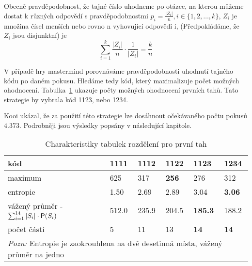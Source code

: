 Obecně pravděpodobnost, že tajné číslo uhodneme po otázce, na kterou můžeme dostat k různých odpovědí s pravděpodobnostmi $p_i = \frac{|Z_i|}{n}, i \in \{1, 2, \dots, k\}$, $Z_i$ je množina čísel menších nebo rovno n vyhovující odpovědi i, (Předpokládáme, že $Z_i$ jsou disjunktní) je 
\[\sum_{i = 1}^k \frac{|Z_i|}{n} \cdot \frac{1}{|Z_i|} = \frac{k}{n}\]

V případě hry mastermind porovnáváme pravděpodobnosti uhodnutí tajného kódu po daném pokusu. Hledáme tedy kód, který maximalizuje počet možných ohodnocení. Tabulka~\ref{tab02} ukazuje počty možných ohodnocení prvních tahů. Tato strategie by vybrala kód 1123, nebo 1234. 

Kooi ukázal, že za použití této strategie lze dosáhnout očekávaného počtu pokusů $4.373$. Podrobněji jsou výsledky popsány v následující kapitole.







\begin{table}[h]
\centering
\begin{tabular}{l l l l l l}
\toprule
kód & 1111 & 1112 & 1122 & 1123 & 1234 \\
\midrule

maximum & 625 & 317 & \textbf{256} & 276 & 312 \\
entropie & 1.50 & 2.69 & 2.89 & 3.04 & \textbf{3.06}\\


vážený průměr - $\sum_{i = 1}^{14} |S_i|  \cdot \operatorname{\textsf{P}} (S_i)$
& 512.0 & 235.9 & 204.5 & \textbf{185.3} & 188.2 \\


počet částí & 5 & 11 & 13 & \textbf{14} & \textbf{14} \\

\bottomrule
\multicolumn{6}{l}{\footnotesize \textit{Pozn:}
Entropie je zaokrouhlena na dvě desetinná místa, vážený průměr na jedno}
\end{tabular}
\caption{Charakteristiky tabulek rozdělení pro první tah}\label{tab02}
\end{table}

